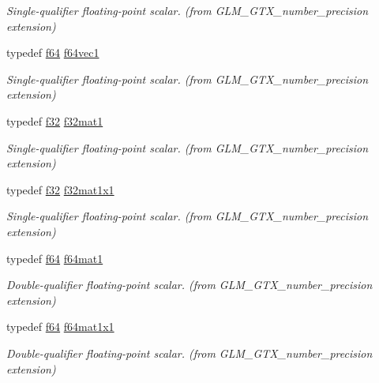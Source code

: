 \begin{DoxyCompactItemize}
\begin{DoxyCompactList}\small\item\em Single-\/qualifier floating-\/point scalar. (from G\+L\+M\+\_\+\+G\+T\+X\+\_\+number\+\_\+precision extension) \end{DoxyCompactList}\item 
typedef \hyperlink{group__gtc__type__precision_ga2bba392e555124b36cde6abba349bab3}{f64} \hyperlink{group__gtx__number__precision_ga44336a26c958d66efdfb5a6c114c538e}{f64vec1}
\begin{DoxyCompactList}\small\item\em Single-\/qualifier floating-\/point scalar. (from G\+L\+M\+\_\+\+G\+T\+X\+\_\+number\+\_\+precision extension) \end{DoxyCompactList}\item 
typedef \hyperlink{group__gtc__type__precision_ga0ec999b57f5330d9021256e96038df04}{f32} \hyperlink{group__gtx__number__precision_gae5ff376ec910c360f06acc0c2b99260c}{f32mat1}
\begin{DoxyCompactList}\small\item\em Single-\/qualifier floating-\/point scalar. (from G\+L\+M\+\_\+\+G\+T\+X\+\_\+number\+\_\+precision extension) \end{DoxyCompactList}\item 
typedef \hyperlink{group__gtc__type__precision_ga0ec999b57f5330d9021256e96038df04}{f32} \hyperlink{group__gtx__number__precision_ga01caec78388a82a9a22bd45e5751a38a}{f32mat1x1}
\begin{DoxyCompactList}\small\item\em Single-\/qualifier floating-\/point scalar. (from G\+L\+M\+\_\+\+G\+T\+X\+\_\+number\+\_\+precision extension) \end{DoxyCompactList}\item 
typedef \hyperlink{group__gtc__type__precision_ga2bba392e555124b36cde6abba349bab3}{f64} \hyperlink{group__gtx__number__precision_ga23f8f53c78b50aa07a113c3d07d01bc9}{f64mat1}
\begin{DoxyCompactList}\small\item\em Double-\/qualifier floating-\/point scalar. (from G\+L\+M\+\_\+\+G\+T\+X\+\_\+number\+\_\+precision extension) \end{DoxyCompactList}\item 
typedef \hyperlink{group__gtc__type__precision_ga2bba392e555124b36cde6abba349bab3}{f64} \hyperlink{group__gtx__number__precision_ga710a5952d78b22635c71c5fc2c0a3319}{f64mat1x1}
\begin{DoxyCompactList}\small\item\em Double-\/qualifier floating-\/point scalar. (from G\+L\+M\+\_\+\+G\+T\+X\+\_\+number\+\_\+precision extension) \end{DoxyCompactList}\end{DoxyCompactItemize}
